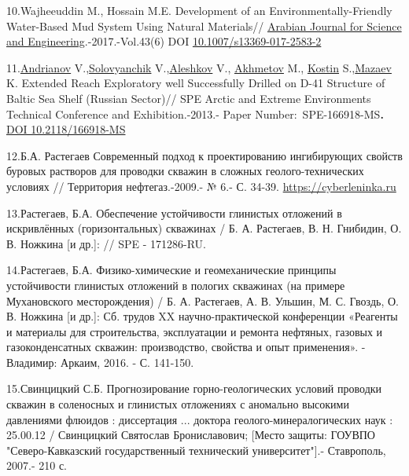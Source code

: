 \begin{references}
10.Wajheeuddin M., Hossain M.E. Development of an
Environmentally-Friendly Water-Based Mud System Using Natural
Materials//
\href{https://www.researchgate.net/journal/Arabian-Journal-for-Science-and-Engineering-2191-4281?_tp=eyJjb250ZXh0Ijp7ImZpcnN0UGFnZSI6InB1YmxpY2F0aW9uIiwicGFnZSI6InB1YmxpY2F0aW9uIn19}{Arabian
Journal for Science and Engineering}.-2017.-Vol.43(6) \linebreak DOI
\href{https://doi.org/10.1007/s13369-017-2583-2}{10.1007/s13369-017-2583-2}

11.\href{javascript:;}{Andrianov} V.,\href{javascript:;}{Solovyanchik}
V.,\href{javascript:;}{Aleshkov} V., \href{javascript:;}{Akhmetov} M.,
\href{javascript:;}{Kostin} S.,\href{javascript:;}{Mazaev} K. Extended
Reach Exploratory well Successfully Drilled on D-41 Structure of Baltic
Sea Shelf (Russian Sector)// SPE Arctic and Extreme Environments
Technical Conference and Exhibition.-2013.- Paper
Number:~SPE-166918-MS{\bfseries .}
\href{https://doi.org/10.2118/166918-MS}{DOI 10.2118/166918-MS}

12.Б.А. Растегаев Современный подход к проектированию ингибирующих
свойств буровых растворов для проводки скважин в сложных
геолого-технических условиях // Территория нефтегаз.-2009.- № 6.- С.
34-39.
\href{https://cyberleninka.ru/article/n/sovremennyy-podhod-k-proektirovaniyu-ingibiruyuschih-svoystv-burovyh-rastvorov-dlya-provodki-skvazhin-v-slozhnyh-geologo-tehnicheskih}{https://cyberleninka.ru}

13.Растегаев, Б.А. Обеспечение устойчивости глинистых отложений в
искривлённых (горизонтальных) скважинах / Б. А. Растегаев, В. Н.
Гнибидин, О. В. Ножкина {[}и др.{]}: // SPE - 171286-RU.

14.Растегаев, Б.А. Физико-химические и геомеханические принципы
устойчивости глинистых отложений в пологих скважинах (на примере
Мухановского месторождения) / Б. А. Растегаев, А. В. Ульшин, М. С.
Гвоздь, О. В. Ножкина {[}и др.{]}: Сб. трудов XX научно-практической
конференции «Реагенты и материалы для строительства, эксплуатации и
ремонта нефтяных, газовых и газоконденсатных скважин: производство,
свойства и опыт применения». - Владимир: Аркаим, 2016. - С. 141-150.

15.Свинцицкий С.Б. Прогнозирование горно-геологических условий проводки
скважин в соленосных и глинистых отложениях с аномально высокими
давлениями флюидов : диссертация ... доктора геолого-минералогических
наук : 25.00.12 / Свинцицкий Святослав Брониславович; {[}Место защиты:
ГОУВПО "Северо-Кавказский государственный технический университет"{]}.-
Ставрополь, 2007.- 210 с.


\end{references}
